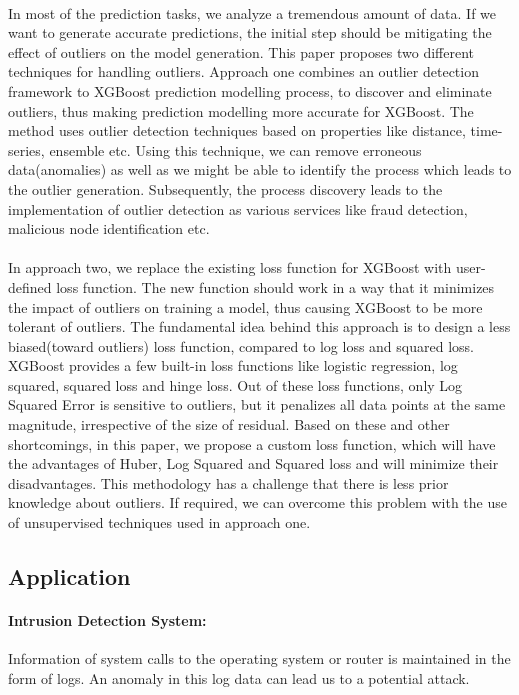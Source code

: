 \documentclass[runningheads]{llncs}
\begin{document}
\paragraph{} In most of the prediction tasks, we analyze a tremendous amount of data. If we want to generate accurate predictions, the initial step should be mitigating the effect of outliers on the model generation. This paper proposes two different techniques for handling outliers. Approach one combines an outlier detection framework to XGBoost prediction modelling process, to discover and eliminate outliers, thus making prediction modelling more accurate for XGBoost. The method uses outlier detection techniques based on properties like distance, time-series, ensemble etc. Using this technique, we can remove erroneous data(anomalies) as well as we might be able to identify the process which leads to the outlier generation. Subsequently, the process discovery leads to the implementation of outlier detection as various services like fraud detection, malicious node identification etc. 

\paragraph{}In approach two, we replace the existing loss function for XGBoost with user-defined loss function. The new function should work in a way that it minimizes the impact of outliers on training a model, thus causing XGBoost to be more tolerant of outliers. The fundamental idea behind this approach is to design a less biased(toward outliers) loss function, compared to log loss and squared loss. XGBoost provides a few built-in loss functions like logistic regression, log squared, squared loss and hinge loss. Out of these loss functions, only Log Squared Error is sensitive to outliers, but it penalizes all data points at the same magnitude, irrespective of the size of residual. Based on these and other shortcomings, in this paper, we propose a custom loss function, which will have the advantages of Huber, Log Squared and Squared loss and will minimize their disadvantages. This methodology has a challenge that there is less prior knowledge about outliers. If required, we can overcome this problem with the use of unsupervised techniques used in approach one.

\subsection{Application}
\paragraph{Intrusion Detection System: } Information of system calls to the operating system or router is maintained in the form of logs. An anomaly in this log data can lead us to a potential attack.
\end{document}
